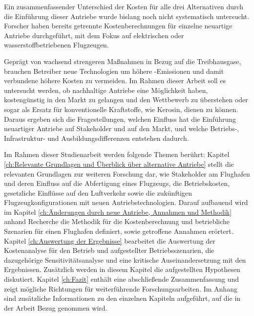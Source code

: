Ein zusammenfassender Unterschied der Kosten für alle drei Alternativen durch die Einführung dieser Antriebe 
wurde bislang noch nicht systematisch untersucht. 
Forscher haben bereits getrennte Kostenberechnungen für einzelne neuartige Antriebe durchgeführt, mit dem Fokus auf
elektrischen oder wasserstoffbetriebenen Flugzeugen. 

Geprägt von wachsend strengeren Maßnahmen in Bezug auf die Treibhausgase, brauchen Betreiber neue Technologien um
höhere -Emissionen und damit verbundene höhere Kosten zu vermeiden.
Im Rahmen dieser Arbeit soll es untersucht werden, ob nachhaltige Antriebe eine Möglichkeit haben, 
kostengünstig in den Markt zu gelangen und den Wettbewerb zu überstehen oder 
sogar als Ersatz für konventionelle Kraftstoffe, wie Kerosin, dienen zu können. 
Daraus ergeben sich die Fragestellungen, welchen Einfluss hat die Einführung neuartiger Antriebe 
auf Stakeholder und auf den Markt, und welche Betriebs-, Infrastruktur- und Ausbildungsdifferenzen entstehen dadurch.

Im Rahmen dieser Studienarbeit werden folgende Themen berührt:
Kapitel \ref{ch:Relevante Grundlagen und Überblick über alternative Antriebe} stellt 
die relevanten Grundlagen zur weiteren Forschung dar, wie Stakeholder am Flughafen und 
deren Einfluss auf die Abfertigung eines Flugzeugs, die Betriebskosten, 
gesetzliche Einflüsse auf den Luftverkehr sowie die zukünftigen Flugzeugkonfigurationen 
mit neuen Antriebstechnologien.
Darauf aufbauend wird im Kapitel \ref{ch:Änderungen durch neue Antriebe, Annahmen und Methodik} 
anhand Recherche die Methodik für die Kostenberechnung und betriebliche Szenarien für einen Flughafen definiert, 
sowie getroffene Annahmen erörtert.
Kapitel \ref{ch:Auswertung der Ergebnisse} bearbeitet die Auswertung der Kostenanalyse 
für den Betrieb und aufgestellter Betriebsszenarien, die dazugehörige Sensitivitätsanalyse und
eine kritische Auseinandersetzung mit den Ergebnissen. 
Zusätzlich werden in diesem Kapitel die aufgestellten Hypothesen diskutiert.
Kapitel \ref{ch:Fazit} enthält eine abschließende Zusammenfassung 
und zeigt mögliche Richtungen für weiterführende Forschungsarbeiten.
Im Anhang sind zusätzliche Informationen zu den einzelnen Kapiteln aufgeführt, 
auf die in der Arbeit Bezug genommen wird.
